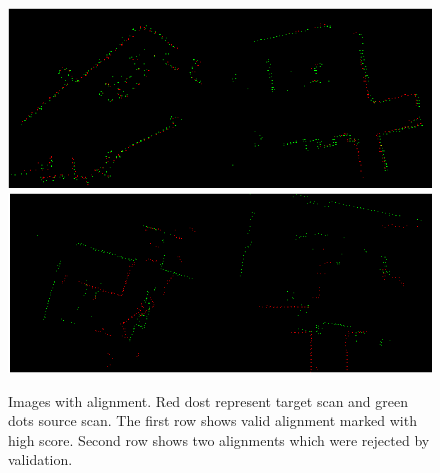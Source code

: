 \begin{figure}
	\centering
	\includegraphics[width=150mm]{../img/good_align.png}
	\includegraphics[width=150mm]{../img/bad_align.png}
	\caption{Images with alignment. Red dost represent target scan and green dots source scan. The first row shows valid alignment marked with high score. Second row shows two alignments which were rejected by validation.}
	\label{fig:bad_align}
\end{figure}
\newpage
